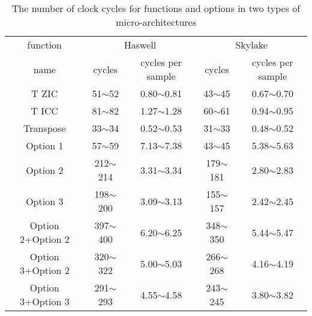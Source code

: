 

\begin{table}[t]
    \caption{The number of clock cycles for functions and options in two types of micro-architectures}  %
    \centering %
    \setlength{\tabcolsep}{1.1pt}
    \begin{tabular}{c|c|c|c|c} %
    \hline\hline %
    function & \multicolumn{2}{c|}{Haswell} & \multicolumn{2}{c}{Skylake} \\ [0.3ex]
    \cline{2-5}
    name & cycles & cycles per sample & cycles & cycles per sample \\ [0.3ex] %
    \hline
    T ZIC & 51$\sim$52 & 0.80$\sim$0.81 & 43$\sim$45 & 0.67$\sim$0.70 \\ [0.3ex]
    T ICC & 81$\sim$82 & 1.27$\sim$1.28 & 60$\sim$61 & 0.94$\sim$0.95 \\ [0.3ex]
    Transpose & 33$\sim$34 & 0.52$\sim$0.53 & 31$\sim$33 & 0.48$\sim$0.52 \\ [0.3ex]
    Option 1 & 57$\sim$59 & 7.13$\sim$7.38 & 43$\sim$45 & 5.38$\sim$5.63 \\ [0.3ex]
    Option 2 & 212$\sim$214 & 3.31$\sim$3.34 & 179$\sim$181 & 2.80$\sim$2.83 \\ [0.3ex]
    Option 3 & 198$\sim$200 & 3.09$\sim$3.13 & 155$\sim$157 & 2.42$\sim$2.45 \\ [0.3ex]
    Option 2+Option 2 & 397$\sim$400 & 6.20$\sim$6.25 & 348$\sim$350 & 5.44$\sim$5.47 \\ [0.3ex]
    Option 3+Option 2 & 320$\sim$322 & 5.00$\sim$5.03 & 266$\sim$268 & 4.16$\sim$4.19 \\ [0.3ex]
    Option 3+Option 3 & 291$\sim$293 & 4.55$\sim$4.58 & 243$\sim$245 & 3.80$\sim$3.82 \\ [1ex]
    \hline
    \end{tabular}
    \label{table:number_of_instructions_in_clock_cycles} %
\end{table}


